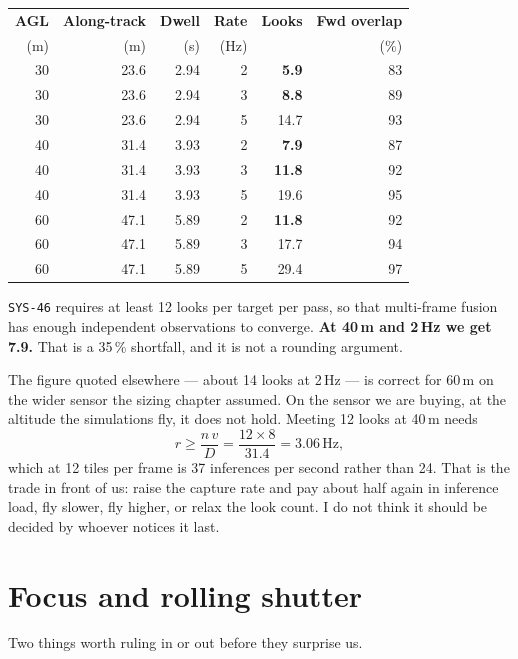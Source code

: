 \documentclass[11pt,a4paper]{article}
\begin{document}
\begin{center}
\begin{tabular}{r r r r r r}
\toprule
\textbf{AGL} & \textbf{Along-track} & \textbf{Dwell} & \textbf{Rate} &
\textbf{Looks} & \textbf{Fwd overlap} \\
(m) & (m) & (s) & (Hz) & & (\%) \\
\midrule
30 & 23.6 & 2.94 & 2 & \textcolor{warn}{\textbf{5.9}} & 83 \\
30 & 23.6 & 2.94 & 3 & \textcolor{warn}{\textbf{8.8}} & 89 \\
30 & 23.6 & 2.94 & 5 & 14.7 & 93 \\
40 & 31.4 & 3.93 & 2 & \textcolor{warn}{\textbf{7.9}} & 87 \\
40 & 31.4 & 3.93 & 3 & \textcolor{warn}{\textbf{11.8}} & 92 \\
40 & 31.4 & 3.93 & 5 & 19.6 & 95 \\
60 & 47.1 & 5.89 & 2 & \textcolor{warn}{\textbf{11.8}} & 92 \\
60 & 47.1 & 5.89 & 3 & 17.7 & 94 \\
60 & 47.1 & 5.89 & 5 & 29.4 & 97 \\
\bottomrule
\end{tabular}
\end{center}

\texttt{SYS-46} requires at least 12 looks per target per
pass, so that multi-frame fusion has enough independent observations to
converge. \textcolor{warn}{\textbf{At 40\,m and 2\,Hz we get
7.9.}} That is a 35\,\% shortfall, and it is not a
rounding argument.

The figure quoted elsewhere --- about 14 looks at 2\,Hz --- is correct for
60\,m on the wider sensor the sizing chapter assumed. On the sensor we are
buying, at the altitude the simulations fly, it does not hold. Meeting
12 looks at 40\,m needs
\[
r \ge \frac{n\,v}{D} = \frac{12 \times 8}{31.4}
= 3.06\,\text{Hz},
\]
which at 12 tiles per frame is 37 inferences per second rather than
24. That is the trade in front of us: raise the capture rate and pay
about half again in inference load, fly slower, fly higher, or relax the look
count. I do not think it should be decided by whoever notices it last.

\section{Focus and rolling shutter}

Two things worth ruling in or out before they surprise us.
\end{document}
